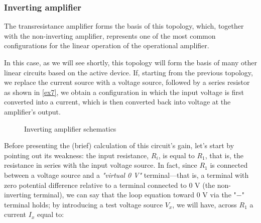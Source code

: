 \documentclass[../main.tex]{subfiles}
\begin{document}
\subsubsection{Inverting amplifier}

The transresistance amplifier forms the basis of this topology, which, together with the non-inverting amplifier, represents one of the most common configurations for the linear operation of the operational amplifier. 

In this case, as we will see shortly, this topology will form the basis of many other linear circuits based on the active device. If, starting from the previous topology, we replace the current source with a voltage source, followed by a series resistor as shown in \autoref{ex7}, we obtain a configuration in which the input voltage is first converted into a current, which is then converted back into voltage at the amplifier’s output.

\begin{figure}
\begin{center}

	
\label{ex8}	
\caption{Inverting amplifier schematics}
\end{center}	
\end{figure}


Before presenting the (brief) calculation of this circuit’s gain, let’s start by pointing out its weakness: the input resistance, $R_i$, is equal to $R_1$, that is, the resistance in series with the input voltage source. 
In fact, since $R_1$ is connected between a voltage source and a \textit{"virtual 0 V"} terminal—that is, a terminal with zero potential difference relative to a terminal connected to 0 V (the non-inverting terminal), we can say that the loop equation toward 0 V via the "$-$" terminal holds; by introducing a test voltage source $V_x$, we will have, across $R_1$ a current $I_x$ equal to:
\end{document}
